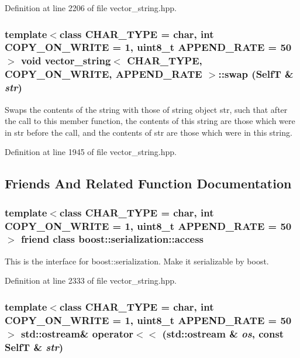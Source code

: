 Definition at line 2206 of file vector\_\-string.hpp.\hypertarget{classvector__string_a18b53a78ca97187d7145d9c004f5d54}{
\subsubsection[{swap}]{\setlength{\rightskip}{0pt plus 5cm}template$<$class CHAR\_\-TYPE  = char, int COPY\_\-ON\_\-WRITE = 1, uint8\_\-t APPEND\_\-RATE = 50$>$ void {\bf vector\_\-string}$<$ CHAR\_\-TYPE, COPY\_\-ON\_\-WRITE, APPEND\_\-RATE $>$::swap ({\bf SelfT} \& {\em str})}}
\label{classvector__string_a18b53a78ca97187d7145d9c004f5d54}


Swaps the contents of the string with those of string object str, such that after the call to this member function, the contents of this string are those which were in str before the call, and the contents of str are those which were in this string. 

Definition at line 1945 of file vector\_\-string.hpp.

\subsection{Friends And Related Function Documentation}
\hypertarget{classvector__string_c98d07dd8f7b70e16ccb9a01abf56b9c}{
\subsubsection[{boost::serialization::access}]{\setlength{\rightskip}{0pt plus 5cm}template$<$class CHAR\_\-TYPE  = char, int COPY\_\-ON\_\-WRITE = 1, uint8\_\-t APPEND\_\-RATE = 50$>$ friend class boost::serialization::access}}
\label{classvector__string_c98d07dd8f7b70e16ccb9a01abf56b9c}


This is the interface for boost::serialization. Make it serializable by boost. 

Definition at line 2333 of file vector\_\-string.hpp.\hypertarget{classvector__string_9f77d965eac7a717e9124196d686e094}{
\subsubsection[{operator$<$$<$}]{\setlength{\rightskip}{0pt plus 5cm}template$<$class CHAR\_\-TYPE  = char, int COPY\_\-ON\_\-WRITE = 1, uint8\_\-t APPEND\_\-RATE = 50$>$ std::ostream\& operator$<$$<$ (std::ostream \& {\em os}, \/  const {\bf SelfT} \& {\em str})}}
\label{classvector__string_9f77d965eac7a717e9124196d686e094}


